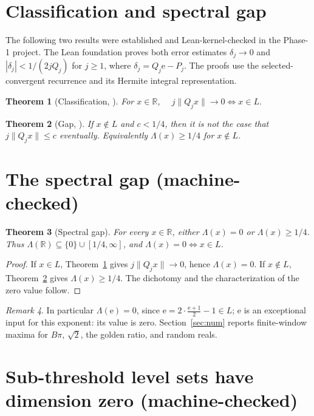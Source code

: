\documentclass[11pt]{article}
\newtheorem{theorem}{Theorem}
\theoremstyle{definition}
\theoremstyle{remark}
\newtheorem{remark}[theorem]{Remark}
\newcommand{\R}{\mathbb{R}}
\newcommand{\ee}{\mathrm{e}}
\newcommand{\Lam}{\Lambda}
\begin{document}
\section{Classification and spectral gap}

The following two results were established and Lean-kernel-checked in the
Phase-1 project. The Lean foundation proves both error estimates
$\delta_j\to0$ and $|\delta_j|<1/(2jQ_j)$ for $j\ge1$, where
$\delta_j=Q_j\ee-P_j$. The proofs use the selected-convergent
recurrence and its Hermite integral representation.

\begin{theorem}[Classification, {\cite[Thm.~2]{Phase1}}]\label{thm:class}
For $x\in\R$, $\quad j\|Q_jx\|\to0\iff x\in L.$
\end{theorem}

\begin{theorem}[Gap, {\cite[Cor.~3]{Phase1}}]\label{thm:gap}
If $x\notin L$ and $c<1/4$, then it is \emph{not} the case that
$j\|Q_jx\|\le c$ eventually. Equivalently $\Lam(x)\ge1/4$ for $x\notin L$.
\end{theorem}

\section{The spectral gap (machine-checked)}

\begin{theorem}[Spectral gap]\label{thm:spectral}
For every $x\in\R$, either $\Lam(x)=0$ or $\Lam(x)\ge1/4$. Thus
$\Lam(\R)\subseteq\{0\}\cup[1/4,\infty]$, and $\Lam(x)=0\iff x\in L$.
\end{theorem}

\begin{proof}
If $x\in L$, Theorem~\ref{thm:class} gives $j\|Q_jx\|\to0$, hence $\Lam(x)=0$.
If $x\notin L$, Theorem~\ref{thm:gap} gives $\Lam(x)\ge1/4$. The dichotomy and
the characterization of the zero value follow.
\end{proof}

\begin{remark}
In particular $\Lam(\ee)=0$, since $\ee=2\cdot\frac{\ee+1}{2}-1\in L$; $\ee$ is
an exceptional input for this exponent: its value is zero.
Section~\ref{sec:num} reports finite-window maxima for $B\pi$, $\sqrt2$,
the golden ratio, and random reals.
\end{remark}

\section{Sub-threshold level sets have dimension zero (machine-checked)}
\end{document}
